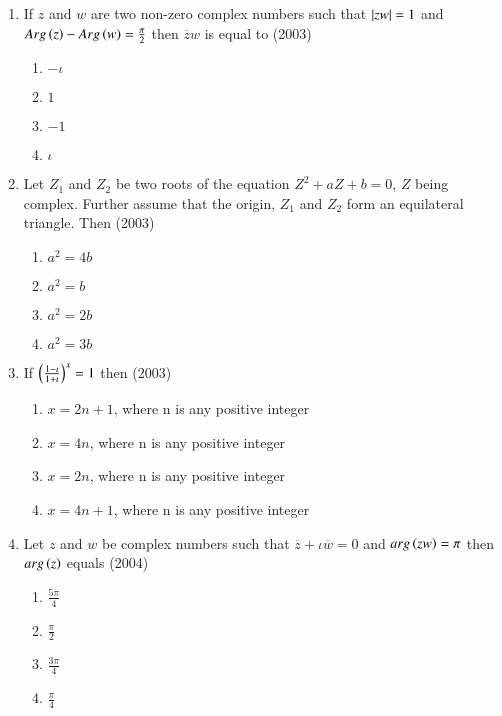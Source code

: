 \documentclass[journal,12pt,twocolumn]{IEEEtran}
\theoremstyle{remark}
\begin{document}
\begin{enumerate}
	\item{If $z$ and $w$ are two non-zero complex numbers such that $\left\vert zw\right\vert=1$ and $Arg\left(z\right) - Arg\left(w\right) = \frac{\pi}{2}$ then $\overline{z}w$ is equal to \hfill (2003)
		\begin{multicols}{4}
		\begin{enumerate}
			\item{$-\iota$}
			\columnbreak
			\item{$1$}
			\columnbreak
			\item{$-1$}
			\columnbreak
			\item{$\iota$}
		\end{enumerate}
		\end{multicols}}

	\item{Let $Z_1$ and $Z_2$ be two roots of the equation $Z^2 + aZ + b = 0$, $Z$ being complex. Further assume that the origin, $Z_1$ and $Z_2$ form an equilateral triangle. Then \hfill (2003)
		\begin{multicols}{2}
		\begin{enumerate}
			\item{$a^2 = 4b$}
			\item{$a^2 = b$}
			\columnbreak
			\item{$a^2 = 2b$}
			\item{$a^2 = 3b$}
		\end{enumerate}
		\end{multicols}}

	\item{If $\left(\frac{1-\iota}{1+\iota}\right)^x = 1$ then \hfill (2003)
		\begin{enumerate}
			\item{$x = 2n + 1$, where n is any positive integer}
			\item{$x = 4n$, where n is any positive integer}
			\item{$x = 2n$, where n is any positive integer}
			\item{$x = 4n + 1$, where n is any positive integer}
		\end{enumerate}}
		
	\item{Let $z$ and $w$ be complex numbers such that $\overline{z} + \iota\overline{w} = 0$ and $arg\left(zw\right) = \pi$ then $arg\left(z\right)$ equals \hfill (2004)
		\begin{multicols}{4}
		\begin{enumerate}
			\item{$\frac{5\pi}{4}$}
			\columnbreak 
			\item{$\frac{\pi}{2}$}
			\columnbreak
			\item{$\frac{3\pi}{4}$}
			\columnbreak
			\item{$\frac{\pi}{4}$}
		\end{enumerate}
		\end{multicols}}


\end{enumerate}
\end{document}
